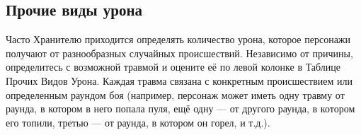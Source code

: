 \documentclass[letterpaper,twocolumn,openany, twoside, 11pt, usenames]{cocbook}
\begin{document}
\subsection*{Прочие виды урона}

Часто Хранителю приходится определять количество урона, которое персонажи получают от разнообразных случайных происшествий. Независимо от причины, определитесь с возможной травмой и оцените её по левой колонке в Таблице Прочих Видов Урона. Каждая травма связана с конкретным происшествием или определенным раундом боя (например, персонаж может иметь одну травму от раунда, в котором в него попала пуля, ещё одну --- от другого раунда, в котором его топили, третью --- от раунда, в котором он горел, и т.д.).

\begin{fullcocpaperbox}{}{}
  \raisebox{-10mm}
  

\end{fullcocpaperbox}
\end{document}
